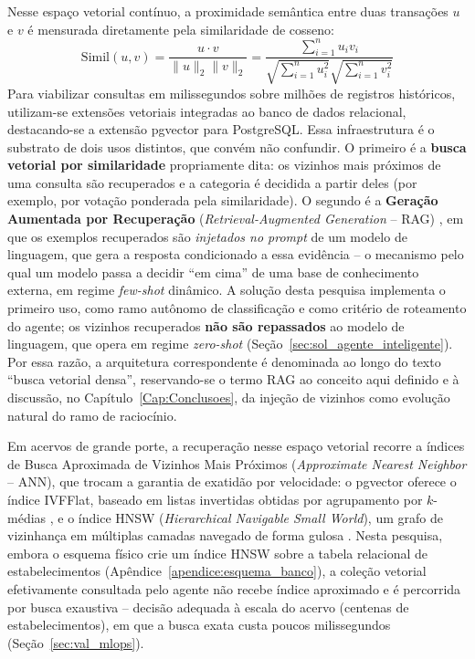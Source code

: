Nesse espaço vetorial contínuo, a proximidade semântica entre duas transações $u$ e $v$ é mensurada diretamente pela similaridade de cosseno:
\begin{equation}
	\text{Simil}(u, v) = \frac{u \cdot v}{\|u\|_2 \|v\|_2} = \frac{\sum_{i=1}^{n} u_i v_i}{\sqrt{\sum_{i=1}^{n} u_i^2} \sqrt{\sum_{i=1}^{n} v_i^2}}
\end{equation}
Para viabilizar consultas em milissegundos sobre milhões de registros históricos, utilizam-se extensões vetoriais integradas ao banco de dados relacional, destacando-se a extensão pgvector para PostgreSQL. Essa infraestrutura é o substrato de dois usos distintos, que convém não confundir. O primeiro é a \textbf{busca vetorial por similaridade} propriamente dita: os vizinhos mais próximos de uma consulta são recuperados e a categoria é decidida a partir deles (por exemplo, por votação ponderada pela similaridade). O segundo é a \textbf{Geração Aumentada por Recuperação} (\textit{Retrieval-Augmented Generation} -- RAG) \cite{lewis2020retrieval}, em que os exemplos recuperados são \textit{injetados no prompt} de um modelo de linguagem, que gera a resposta condicionado a essa evidência -- o mecanismo pelo qual um modelo passa a decidir ``em cima'' de uma base de conhecimento externa, em regime \textit{few-shot} dinâmico. A solução desta pesquisa implementa o primeiro uso, como ramo autônomo de classificação e como critério de roteamento do agente; os vizinhos recuperados \textbf{não são repassados} ao modelo de linguagem, que opera em regime \textit{zero-shot} (Seção~\ref{sec:sol_agente_inteligente}). Por essa razão, a arquitetura correspondente é denominada ao longo do texto ``busca vetorial densa'', reservando-se o termo RAG ao conceito aqui definido e à discussão, no Capítulo~\ref{Cap:Conclusoes}, da injeção de vizinhos como evolução natural do ramo de raciocínio.

Em acervos de grande porte, a recuperação nesse espaço vetorial recorre a índices de Busca Aproximada de Vizinhos Mais Próximos (\textit{Approximate Nearest Neighbor} -- ANN), que trocam a garantia de exatidão por velocidade: o pgvector oferece o índice IVFFlat, baseado em listas invertidas obtidas por agrupamento por $k$-médias \cite{jegou2011product}, e o índice HNSW (\textit{Hierarchical Navigable Small World}), um grafo de vizinhança em múltiplas camadas navegado de forma gulosa \cite{malkov2020hnsw}. Nesta pesquisa, embora o esquema físico crie um índice HNSW sobre a tabela relacional de estabelecimentos (Apêndice~\ref{apendice:esquema_banco}), a coleção vetorial efetivamente consultada pelo agente não recebe índice aproximado e é percorrida por busca exaustiva -- decisão adequada à escala do acervo (centenas de estabelecimentos), em que a busca exata custa poucos milissegundos (Seção~\ref{sec:val_mlops}).

